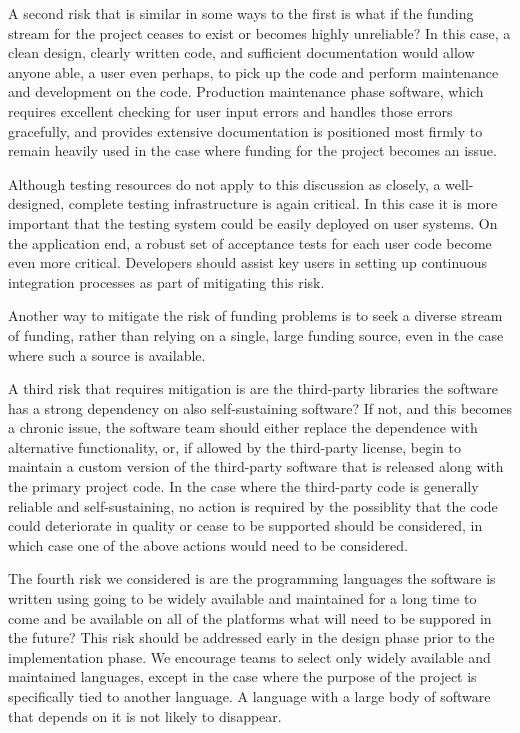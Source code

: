 \documentclass[11pt]{SANDreport}
\begin{document}
A second risk that is similar in some ways to the first is what if the funding
stream for the project ceases to exist or becomes highly unreliable?  In this
case, a clean design, clearly written code, and sufficient documentation would
allow anyone able, a user even perhaps, to pick up the code and perform
maintenance and development on the code.  Production maintenance phase
software, which requires excellent checking for user input errors and handles
those errors gracefully, and provides extensive documentation is positioned
most firmly to remain heavily used in the case where funding for the project
becomes an issue.

Although testing resources do not apply to this
discussion as closely, a well-designed, complete testing infrastructure is
again critical.  In this case it is more important that the testing system
could be easily deployed on user systems.  On the application end, a robust
set of acceptance tests for each user code become even more critical.
Developers should assist key users in setting up continuous integration
processes as part of mitigating this risk.

Another way to mitigate the risk of funding problems is to seek a diverse
stream of funding, rather than relying on a single, large funding source, even
in the case where such a source is available.

A third risk that requires mitigation is are the third-party libraries the
software has a strong dependency on also self-sustaining software?  If not,
and this becomes a chronic issue, the software team should either replace the
dependence with alternative functionality, or, if allowed by the third-party
license, begin to maintain a custom version of the third-party software that
is released along with the primary project code.  In the case where the
third-party code is generally reliable and self-sustaining, no action is
required by the possiblity that the code could deteriorate in quality or cease
to be supported should be considered, in which case one of the above actions
would need to be considered.

The fourth risk we considered is are the programming languages the software is
written using going to be widely available and maintained for a long time to
come and be available on all of the platforms what will need to be suppored
in the future?  This risk should be addressed early in the design phase prior
to the implementation phase.  We encourage teams to select only widely
available and maintained languages, except in the case where the purpose of
the project is specifically tied to another language.  A language with a large
body of software that depends on it is not likely to disappear.
\end{document}
